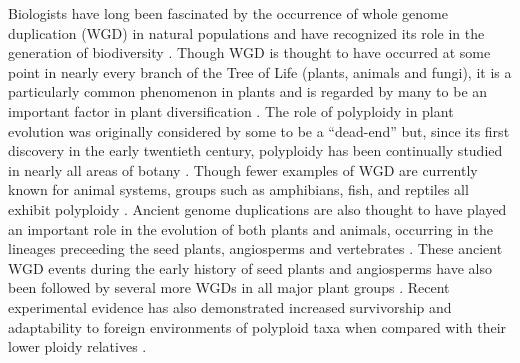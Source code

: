 \documentclass[11pt,english,letterpaper,oneside]{article}
\begin{document}
Biologists have long been fascinated by the occurrence of whole genome duplication (WGD) in natural populations and have recognized its role in the generation of biodiversity \citep{ClausKeckHies1940,StebbinsVariationEvolution,GrantPlantSpeciation,otto2000polyploidy}. Though WGD is thought to have occurred at some point in nearly every branch of the Tree of Life (plants, animals and fungi), it is a particularly common phenomenon in plants and is regarded by many to be an important factor in plant diversification \citep{wood2009polyploid,soltisd2009diversification,scarpino2014polyploid}. The role of polyploidy in plant evolution was originally considered by some to be a ``dead-end'' \citep{StebbinsVariationEvolution,wagner1970noise,soltisd2014stebbins} but, since its first discovery in the early twentieth century, polyploidy has been continually studied in nearly all areas of botany \citep{winge1917polyploidy,Winkler1916polyploidy,ClausKeckHies1945polyploidy,GrantPlantSpeciation,StebbinsVariationEvolution,soltisD2003polyploid,soltisd2010polyploidUnknowns,soltai2009roleOfHybridization,ramsey2014polEcoProcRoySoc}. Though fewer examples of WGD are currently known for animal systems, groups such as amphibians, fish, and reptiles all exhibit polyploidy \citep{allendorf1984tetraploidFish,gregory2005polyploidyAnimals}. Ancient genome duplications are also thought to have played an important role in the evolution of both plants and animals, occurring in the lineages preceeding the seed plants, angiosperms and vertebrates \citep{ohno1970geneDuplication,otto2000polyploidy,furlong2001animalOctoploid,jiao2011ancientWGD}. These ancient WGD events during the early history of seed plants and angiosperms have also been followed by several more WGDs in all major plant groups \citep{cui2006genomeDuplication,scarpino2014polyploid,canon2014polyploidyLegumes}. Recent experimental evidence has also demonstrated increased survivorship and adaptability to foreign environments of polyploid taxa when compared with their lower ploidy relatives \citep{ramsey2011polyploidEcology,Selmecki2015yeastAdaptation}.
\medskip
\end{document}
